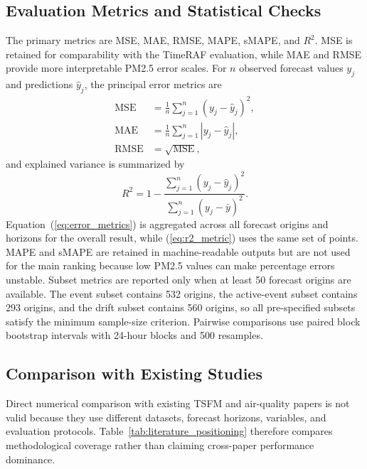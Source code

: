 \subsection{Evaluation Metrics and Statistical Checks}
The primary metrics are MSE, MAE, RMSE, MAPE, sMAPE, and $R^2$. MSE is retained
for comparability with the TimeRAF evaluation, while MAE and RMSE provide more
interpretable PM2.5 error scales. For $n$ observed forecast values $y_j$ and
predictions $\hat{y}_j$, the principal error metrics are
\begin{equation}
\begin{aligned}
\operatorname{MSE}&=\frac{1}{n}\sum_{j=1}^{n}(y_j-\hat{y}_j)^2,\\
\operatorname{MAE}&=\frac{1}{n}\sum_{j=1}^{n}|y_j-\hat{y}_j|,\\
\operatorname{RMSE}&=\sqrt{\operatorname{MSE}},
\end{aligned}
\label{eq:error_metrics}
\end{equation}
and explained variance is summarized by
\begin{equation}
R^2=1-\frac{\sum_{j=1}^{n}(y_j-\hat{y}_j)^2}
{\sum_{j=1}^{n}(y_j-\bar{y})^2}.
\label{eq:r2_metric}
\end{equation}
Equation~(\ref{eq:error_metrics}) is aggregated across all forecast origins and
horizons for the overall result, while (\ref{eq:r2_metric}) uses the same set of
points. MAPE and sMAPE are retained in machine-readable outputs but are not used
for the main ranking because low PM2.5 values can make percentage errors
unstable. Subset metrics are reported only when at least
50 forecast origins are available. The event subset contains 532 origins, the
active-event subset contains 293 origins, and the drift subset contains 560
origins, so all pre-specified subsets satisfy the minimum sample-size criterion. Pairwise comparisons
use paired block bootstrap intervals with 24-hour blocks and 500 resamples.

\subsection{Comparison with Existing Studies}
Direct numerical comparison with existing TSFM and air-quality papers is not
valid because they use different datasets, forecast horizons, variables, and
evaluation protocols. Table~\ref{tab:literature_positioning} therefore compares
methodological coverage rather than claiming cross-paper performance dominance.

